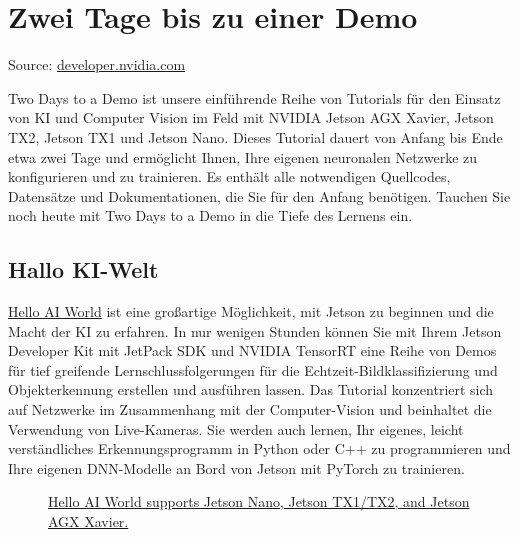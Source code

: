 %
%



\chapter{Zwei Tage bis zu einer Demo}

{

{\tiny Source: \href{https://developer.nvidia.com/embedded/twodaystoademo}{developer.nvidia.com}}

Two Days to a Demo ist unsere einführende Reihe von Tutorials für den Einsatz von KI und Computer Vision im Feld mit NVIDIA Jetson AGX Xavier, Jetson TX2, Jetson TX1 und Jetson Nano. Dieses Tutorial dauert von Anfang bis Ende etwa zwei Tage und ermöglicht Ihnen, Ihre eigenen neuronalen Netzwerke zu konfigurieren und zu trainieren. Es enthält alle notwendigen Quellcodes, Datensätze und Dokumentationen, die Sie für den Anfang benötigen. Tauchen Sie noch heute mit Two Days to a Demo in die Tiefe des Lernens ein.


\section{Hallo KI-Welt}

\href{https://github.com/dusty-nv/jetson-inference}{Hello AI World} ist eine großartige Möglichkeit, mit Jetson zu beginnen und die Macht der KI zu erfahren. In nur wenigen Stunden können Sie mit Ihrem Jetson Developer Kit mit JetPack SDK und NVIDIA TensorRT eine Reihe von Demos für tief greifende Lernschlussfolgerungen für die Echtzeit-Bildklassifizierung und Objekterkennung erstellen und ausführen lassen. Das Tutorial konzentriert sich auf Netzwerke im Zusammenhang mit der Computer-Vision und beinhaltet die Verwendung von Live-Kameras. Sie werden auch lernen, Ihr eigenes, leicht verständliches Erkennungsprogramm in Python oder C++ zu programmieren und Ihre eigenen DNN-Modelle an Bord von Jetson mit PyTorch zu trainieren.


\begin{figure}

  \caption{\href{https://github.com/dusty-nv/jetson-inference}{Hello AI World supports Jetson Nano, Jetson TX1/TX2, and Jetson AGX Xavier.}}
\end{figure}


}
